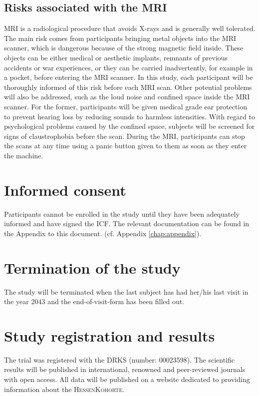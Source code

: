 \subsection{Risks associated with the \ac{MRI}}
\ac{MRI} is a radiological procedure that avoids X-rays and is generally well tolerated. The main risk comes from participants bringing metal objects into the \ac{MRI} scanner, which is dangerous because of the strong magnetic field inside. These objects can be either medical or aesthetic implants, remnants of previous accidents or war experiences, or they can be carried inadvertently, for example in a pocket, before entering the \ac{MRI} scanner. In this study, each participant will be thoroughly informed of this risk before each \ac{MRI} scan. Other potential problems will also be addressed, such as the loud noise and confined space inside the \ac{MRI} scanner. For the former, participants will be given medical grade ear protection to prevent hearing loss by reducing sounds to harmless intensities. With regard to psychological problems caused by the confined space, subjects will be screened for signs of claustrophobia before the scan. During the \ac{MRI}, participants can stop the scans at any time using a panic button given to them as soon as they enter the machine.

\section{Informed consent}
Participants cannot be enrolled in the study until they have been adequately informed and have signed the \ac{ICF}. The relevant documentation can be found in the Appendix to this document. (cf. Appendix \ref{chap:appendix}).

\section{Termination of the study}
The study will be terminated when the last subject has had her/his last visit in the year 2043 and the end-of-visit-form has been filled out.

\section{Study registration and results}
The trial was registered with the \ac{DRKS} (number: 00023598). The scientific results will be published in international, renowned and peer-reviewed journals with open access. All data will be published on a website dedicated to providing information about the \textsc{HessenKohorte}.


